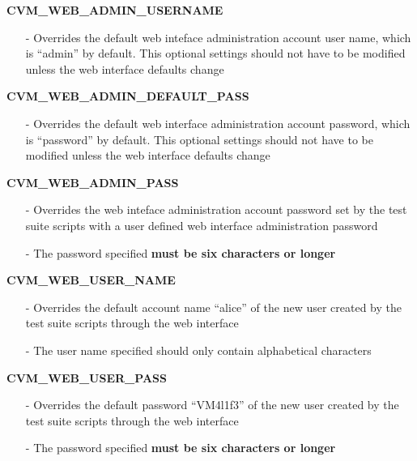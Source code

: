 \begin{description}
\item {\bf CVM\_WEB\_ADMIN\_USERNAME}
		\begin{itemize}
		\item[-]	Overrides the default web inteface administration account user name,
				which is ``admin'' by default. This optional settings should not 
				have to be modified unless the \cernvm web interface defaults change
		\end{itemize}
		
\item {\bf CVM\_WEB\_ADMIN\_DEFAULT\_PASS}
		\begin{itemize}
		\item[-]	Overrides the default web interface administration account password,
				which is ``password'' by default. This optional settings should not 
				have to be modified unless the \cernvm web interface defaults change
		\end{itemize}
		
\item {\bf CVM\_WEB\_ADMIN\_PASS}
		\begin{itemize}
		\item[-]	Overrides the web inteface administration account password set by
				the test suite scripts with a user defined web interface
				administration password
		\item[-]	The password specified {\bf must be six characters or longer}
		\end{itemize}

\item {\bf CVM\_WEB\_USER\_NAME}
		\begin{itemize}
		\item[-]	Overrides the default account name ``alice'' of the new user created 
				by the test suite scripts through the web interface
		\item[-]	The user name specified should only contain alphabetical characters
		\end{itemize}
		
\item {\bf CVM\_WEB\_USER\_PASS}
		\begin{itemize}
		\item[-]	Overrides the default password ``VM4l1f3'' of the new user created 
				by the test suite scripts through the web interface
		\item[-]	The password specified {\bf must be six characters or longer}
		\end{itemize}


\end{description}
